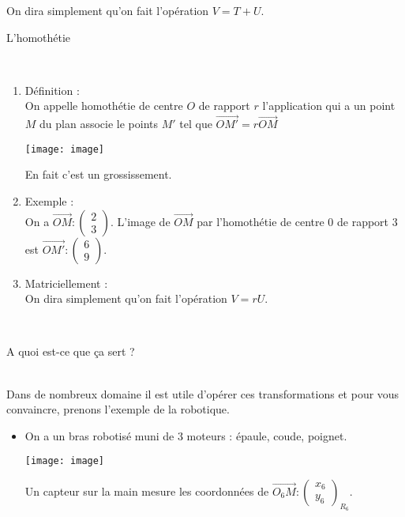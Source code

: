 \documentclass[11]{article}
\newcommand\coordo[2]{\begin{pmatrix} #1 \\#2 \end{pmatrix}}
\begin{document}
\begin{enumerate}
\begin{enumerate}
On dira simplement qu'on fait l'opération $V = T + U$.

\end{enumerate}

\newpage

\begin{Large} \item L'homothétie \end{Large} \\

\begin{enumerate}
\item Définition :  \\
On appelle homothétie de centre $O$ de rapport $r$ l'application qui a un point $M$ du plan associe le points $M'$ tel que $\overrightarrow{OM'} = r\overrightarrow{OM}$

\begin{multicols}{2}
\begin{minipage}{23em}
\texttt{[image: image]}
\end{minipage}
\begin{minipage}{23em}
\vspace{3\baselineskip}
En fait c'est un grossissement.
\end{minipage}
\end{multicols}

\item Exemple : \\
On a $\overrightarrow{OM}:\coordo{2}{3}$. 
L'image de $\overrightarrow{OM}$ par l'homothétie de centre $0$ de rapport $3$ est $\overrightarrow{OM'}:\coordo{6}{9}$.

\item Matriciellement : \\

On dira simplement qu'on fait l'opération $V = rU$.
\end{enumerate}

\hrulefill \\

\begin{Large} \item A quoi est-ce que ça sert ? \end{Large} \\


Dans de nombreux domaine il est utile d'opérer ces transformations et pour vous convaincre, prenons l'exemple de la robotique.

\begin{itemize}
\item On a un bras robotisé muni de 3 moteurs : épaule, coude, poignet.
\begin{multicols}{2}
\begin{minipage}{23em}
\texttt{[image: image]}
\end{minipage}
\begin{minipage}{23em}
\vspace{3\baselineskip}
Un capteur sur la main mesure les coordonnées de $\overrightarrow{O_6M}: \coordo{x_6}{y_6}_{R_6}$. \\


\end{minipage}
\end{multicols}
\end{itemize}
\end{enumerate}
\end{document}
